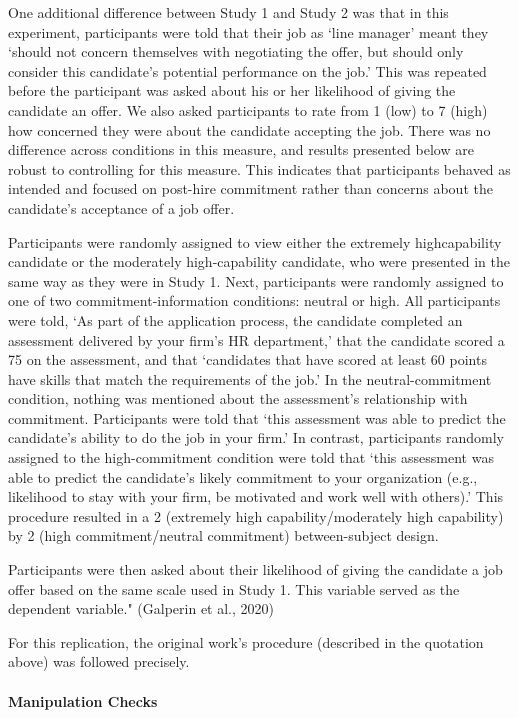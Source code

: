 \documentclass[]{article}
\let\oldparagraph\paragraph
\renewcommand{\paragraph}[1]{\oldparagraph{#1}\mbox{}}
\begin{document}
One additional difference between Study 1 and Study 2 was that in this
experiment, participants were told that their job as `line manager'
meant they `should not concern themselves with negotiating the offer,
but should only consider this candidate's potential performance on the
job.' This was repeated before the participant was asked about his or
her likelihood of giving the candidate an offer. We also asked
participants to rate from 1 (low) to 7 (high) how concerned they were
about the candidate accepting the job. There was no difference across
conditions in this measure, and results presented below are robust to
controlling for this measure. This indicates that participants behaved
as intended and focused on post-hire commitment rather than concerns
about the candidate's acceptance of a job offer.

Participants were randomly assigned to view either the extremely
highcapability candidate or the moderately high-capability candidate,
who were presented in the same way as they were in Study 1. Next,
participants were randomly assigned to one of two commitment-information
conditions: neutral or high. All participants were told, `As part of the
application process, the candidate completed an assessment delivered by
your firm's HR department,' that the candidate scored a 75 on the
assessment, and that `candidates that have scored at least 60 points
have skills that match the requirements of the job.' In the
neutral-commitment condition, nothing was mentioned about the
assessment's relationship with commitment. Participants were told that
`this assessment was able to predict the candidate's ability to do the
job in your firm.' In contrast, participants randomly assigned to the
high-commitment condition were told that `this assessment was able to
predict the candidate's likely commitment to your organization (e.g.,
likelihood to stay with your firm, be motivated and work well with
others).' This procedure resulted in a 2 (extremely high
capability/moderately high capability) by 2 (high commitment/neutral
commitment) between-subject design.

Participants were then asked about their likelihood of giving the
candidate a job offer based on the same scale used in Study 1. This
variable served as the dependent variable." (Galperin et al., 2020)

For this replication, the original work's procedure (described in the
quotation above) was followed precisely.

\hypertarget{manipulation-checks}{%
\paragraph{Manipulation Checks}\label{manipulation-checks}}
\end{document}
